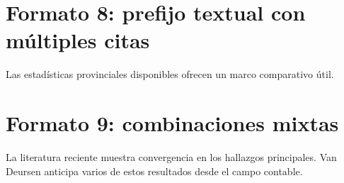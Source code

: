 \section{Formato 8: prefijo textual con múltiples citas}
Las estadísticas provinciales disponibles \autocite{2566-CEPAL2021,2565-HARGITTAI2002} ofrecen un marco comparativo útil.


\section{Formato 9: combinaciones mixtas}
La literatura reciente \autocite{2562-WARSCHAUER2004,2563-VANDIJK2020,2566-CEPAL2021} muestra convergencia en los hallazgos principales. Van Deursen \autocite{2564-VANDEURSEN2019} anticipa varios de estos resultados desde el campo contable.


